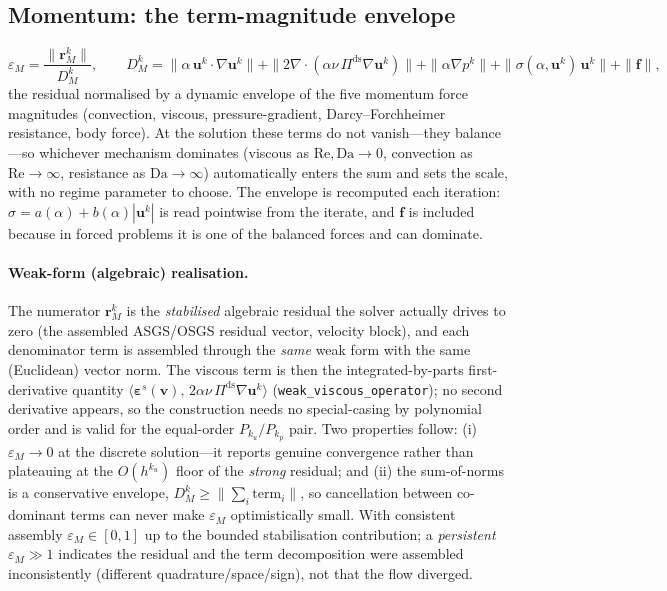 \documentclass{article}
\newcommand{\code}[1]{\texttt{\small #1}}
\begin{document}
\subsection{Momentum: the term-magnitude envelope}
\begin{equation}
    \label{eq:cc-epsM}
    \varepsilon_M = \frac{\|\boldsymbol{r}_M^k\|}{D_M^k}, \qquad
    D_M^k = \|\alpha\,\boldsymbol{u}^k\!\cdot\!\nabla\boldsymbol{u}^k\|
          + \|2\nabla\!\cdot\!(\alpha\nu\,\Pi^{\mathrm{ds}}\nabla\boldsymbol{u}^k)\|
          + \|\alpha\nabla p^k\|
          + \|\sigma(\alpha,\boldsymbol{u}^k)\,\boldsymbol{u}^k\|
          + \|\boldsymbol{f}\| ,
\end{equation}
the residual normalised by a dynamic envelope of the five momentum force magnitudes (convection,
viscous, pressure-gradient, Darcy--Forchheimer resistance, body force). At the solution these terms do
not vanish---they balance---so whichever mechanism dominates (viscous as
$\mathrm{Re},\mathrm{Da}\to0$, convection as $\mathrm{Re}\to\infty$, resistance as
$\mathrm{Da}\to\infty$) automatically enters the sum and sets the scale, with no regime parameter to
choose. The envelope is recomputed each iteration: $\sigma=a(\alpha)+b(\alpha)|\boldsymbol{u}^k|$ is
read pointwise from the iterate, and $\boldsymbol{f}$ is included because in forced problems it is one
of the balanced forces and can dominate.

\paragraph{Weak-form (algebraic) realisation.} The numerator $\boldsymbol{r}_M^k$ is the
\emph{stabilised} algebraic residual the solver actually drives to zero (the assembled ASGS/OSGS
residual vector, velocity block), and each denominator term is assembled through the \emph{same} weak
form with the same (Euclidean) vector norm. The viscous term is then the integrated-by-parts
first-derivative quantity
$\langle\boldsymbol{\varepsilon}^s(\boldsymbol{v}),\,2\alpha\nu\,\Pi^{\mathrm{ds}}\nabla\boldsymbol{u}^k\rangle$
(\code{weak\_viscous\_operator}); no second derivative appears, so the construction needs no
special-casing by polynomial order and is valid for the equal-order $P_{k_u}/P_{k_p}$ pair. Two
properties follow: (i) $\varepsilon_M\to0$ at the discrete solution---it reports genuine convergence
rather than plateauing at the $O(h^{k_u})$ floor of the \emph{strong} residual; and (ii) the
sum-of-norms is a conservative envelope, $D_M^k \ge \|\sum_i \mathrm{term}_i\|$, so cancellation between
co-dominant terms can never make $\varepsilon_M$ optimistically small. With consistent assembly
$\varepsilon_M\in[0,1]$ up to the bounded stabilisation contribution; a \emph{persistent}
$\varepsilon_M\gg1$ indicates the residual and the term decomposition were assembled inconsistently
(different quadrature/space/sign), not that the flow diverged.
\end{document}
